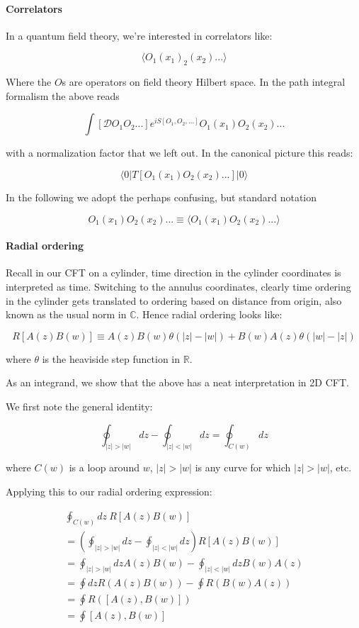 \paragraph{ Correlators}
In a quantum field theory, we're interested in correlators like:

$$\langle O_1(x_1) _2(x_2) ... \rangle$$

Where the $O$s are operators on field theory Hilbert space. In the path integral formalism the above reads

$$\int [\mathcal DO_1O_2... ] e^{iS[O_1, O_2, ...]}  O_1(x_1)O_2(x_2)...$$

with a normalization factor that we left out. In the canonical picture this reads:

$$\langle 0 | T [O_1(x_1) O_2(x_2) ...] | 0 \rangle$$

In the following we adopt the perhaps confusing, but standard notation

$$ O_1(x_1) O_2(x_2) ...\equiv \langle O_1(x_1) O_2(x_2) ... \rangle$$


\paragraph{ Radial ordering}

Recall in our CFT on a cylinder, time direction in the cylinder coordinates is interpreted as time. Switching to the annulus coordinates, clearly time ordering in the cylinder gets translated to ordering based on distance from origin, also known as the usual norm in $\mathbb C$. Hence radial ordering looks like:

$$R[A(z) B(w)] \equiv A(z)B(w) \theta(|z| - |w|) + B(w)A(z) \theta(|w| - |z|)$$

where $\theta$ is the heaviside step function in $\mathbb R$.

As an integrand, we show that the above has a neat interpretation in 2D CFT.

We first note the general identity:

$$ \oint_{|z| > |w|}dz - \oint_{|z| < |w|}dz  = \oint_{C(w)}dz$$

where $C(w)$ is a loop around $w$, $|z| > |w|$ is any curve for which $|z| > |w|$, etc.

Applying this to our radial ordering expression:

\begin{align}
\oint_{C(w)}dz~ R[A(z) B(w)] \\
= \left(\oint_{|z| > |w|}dz - \oint_{|z| < |w|}dz \right)R[A(z) B(w)]\\
= \oint_{|z| > |w|}dz A(z)B(w) - \oint_{|z| < |w|}dzB(w)A(z) \\
= \oint dz R(A(z)B(w)) - \oint R(B(w)A(z)) \\
= \oint R([A(z), B(w)]) \\
= \oint [A(z), B(w)]
\end{align}

